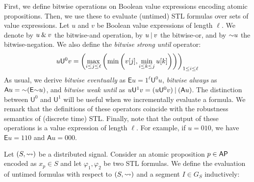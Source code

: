 First, we define bitwise operations on Boolean value expressions encoding atomic propositions.
Then, we use these to evaluate (untimed) STL formulas over sets of value expressions.
%
Let $u$ and $v$ be Boolean value expressions of length $\ell$.
We denote by $u \mathbin{\&} v$ the bitwise-and operation, by $u \mathbin{|} v$ the bitwise-or, and by $\mathord{\sim} u$ the bitwise-negation.
We also define the \emph{bitwise strong until} operator:
%
\[\small u \mathsf{U}^0 v = \left( \max_{i \leq j \leq \ell} \left( \min \left( v[j], \min_{i \leq k \leq j} u[k] \right) \right) \right)_{1 \leq i \leq \ell} \]
\normalsize
%
As usual, we derive \emph{bitwise eventually} as 
$\mathsf{E} u = 1^\ell \mathsf{U}^0 u$, \emph{bitwise always} as $\mathsf{A} u = \mathord{\sim} 
(\mathsf{E} \mathord{\sim} u)$, and \emph{bitwise weak until} as $u \mathsf{U}^1 v = (u \mathsf{U}^0 v) 
\mathbin{|} (\mathsf{A} u)$.
The distinction between $\mathsf{U}^0$ and $\mathsf{U}^1$ will be useful when we incrementally evaluate a formula.
We remark that the definitions of these operators coincide with the robustness semantics of (discrete time) STL.
Finally, note that the output of these operations is a value expression of length $\ell$.
For example, if $u = 010$, we have $\mathsf{E} u = 110$ and $\mathsf{A} u = 000$.


Let  $(S, {\rightsquigarrow})$ be a distributed signal.
Consider an atomic proposition $p \in \mathsf{AP}$ encoded as $x_p \in S$ and let $\varphi_1, \varphi_2$ be two STL formulas.
We define the evaluation of untimed formulas with respect to $(S, {\rightsquigarrow})$ and a segment $I \in G_S$ inductively:

